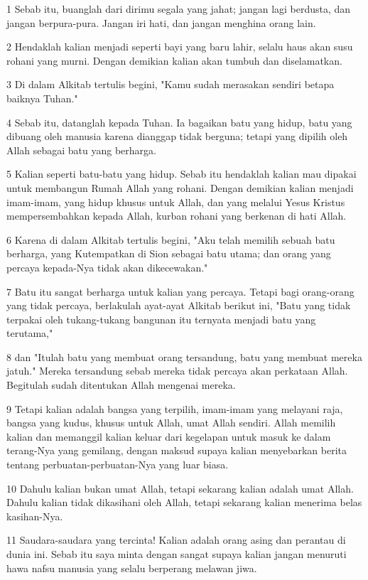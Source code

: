 \par 1 Sebab itu, buanglah dari dirimu segala yang jahat; jangan lagi berdusta, dan jangan berpura-pura. Jangan iri hati, dan jangan menghina orang lain.
\par 2 Hendaklah kalian menjadi seperti bayi yang baru lahir, selalu haus akan susu rohani yang murni. Dengan demikian kalian akan tumbuh dan diselamatkan.
\par 3 Di dalam Alkitab tertulis begini, "Kamu sudah merasakan sendiri betapa baiknya Tuhan."
\par 4 Sebab itu, datanglah kepada Tuhan. Ia bagaikan batu yang hidup, batu yang dibuang oleh manusia karena dianggap tidak berguna; tetapi yang dipilih oleh Allah sebagai batu yang berharga.
\par 5 Kalian seperti batu-batu yang hidup. Sebab itu hendaklah kalian mau dipakai untuk membangun Rumah Allah yang rohani. Dengan demikian kalian menjadi imam-imam, yang hidup khusus untuk Allah, dan yang melalui Yesus Kristus mempersembahkan kepada Allah, kurban rohani yang berkenan di hati Allah.
\par 6 Karena di dalam Alkitab tertulis begini, "Aku telah memilih sebuah batu berharga, yang Kutempatkan di Sion sebagai batu utama; dan orang yang percaya kepada-Nya tidak akan dikecewakan."
\par 7 Batu itu sangat berharga untuk kalian yang percaya. Tetapi bagi orang-orang yang tidak percaya, berlakulah ayat-ayat Alkitab berikut ini, "Batu yang tidak terpakai oleh tukang-tukang bangunan itu ternyata menjadi batu yang terutama,"
\par 8 dan "Itulah batu yang membuat orang tersandung, batu yang membuat mereka jatuh." Mereka tersandung sebab mereka tidak percaya akan perkataan Allah. Begitulah sudah ditentukan Allah mengenai mereka.
\par 9 Tetapi kalian adalah bangsa yang terpilih, imam-imam yang melayani raja, bangsa yang kudus, khusus untuk Allah, umat Allah sendiri. Allah memilih kalian dan memanggil kalian keluar dari kegelapan untuk masuk ke dalam terang-Nya yang gemilang, dengan maksud supaya kalian menyebarkan berita tentang perbuatan-perbuatan-Nya yang luar biasa.
\par 10 Dahulu kalian bukan umat Allah, tetapi sekarang kalian adalah umat Allah. Dahulu kalian tidak dikasihani oleh Allah, tetapi sekarang kalian menerima belas kasihan-Nya.
\par 11 Saudara-saudara yang tercinta! Kalian adalah orang asing dan perantau di dunia ini. Sebab itu saya minta dengan sangat supaya kalian jangan menuruti hawa nafsu manusia yang selalu berperang melawan jiwa.
